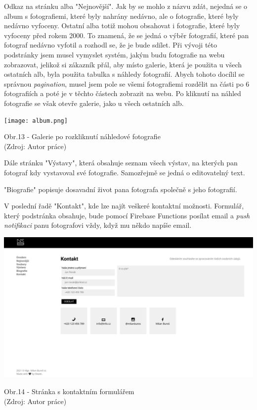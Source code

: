 \documentclass[12pt,a4paper]{report}
\begin{document}
  Odkaz na stránku alba "Nejnovější". 
  Jak by se mohlo z názvu zdát, nejedná se o album s fotografiemi, které byly nahrány nedávno, ale 
  o fotografie, které byly nedávno vyfoceny. Ostatní alba totiž mohou obsahovat i fotografie, které byly
  vyfoceny před rokem 2000. To znamená, že se
  jedná o výběr fotografií, které pan fotograf nedávno vyfotil a rozhodl se, že je bude sdílet. Při
  vývoji této podstránky jsem musel vymyslet systém, jakým budu fotografie na webu zobrazovat,
  jelikož si zákazník přál, aby místo galerie, která je použita u všech ostatních alb, byla použita
  tabulka s náhledy fotografií. Abych tohoto docílil se správnou \emph{pagination}, musel jsem pole
  se všemi fotografiemi rozdělit na části po 6 fotografiích a poté je v těchto částech zobrazit na
  webu. Po kliknutí na náhled fotografie se však otevře galerie, jako u všech ostatních alb.
  
  \vspace*{0.5cm}
  \noindent\texttt{[image: album.png]}
  \begin{center}
    Obr.13 - Galerie po rozkliknutí náhledové fotografie  \\
    (Zdroj: Autor práce)
  \end{center}
  \vspace*{0.5cm}
 
  Dále stránku "Výstavy", která obsahuje seznam všech výstav, na kterých pan fotograf kdy vystavoval
  své fotografie. Samozřejmě se jedná o editovatelný text.
  
  "Biografie" popisuje dosavadní život pana fotografa společně s jeho fotografií.
  
  V poslední řadě "Kontakt", kde lze najít veškeré kontaktní možnosti. Formulář, který podstránka
  obsahuje, bude pomocí Firebase Functions posílat email a \emph{push notifikaci} panu fotografovi vždy,
  když mu někdo napíše email.

  \vspace*{0.5cm}
  \noindent\includegraphics[width=\linewidth]{contact.png}
  \begin{center}
    Obr.14 -  Stránka s kontaktním formulářem \\
    (Zdroj: Autor práce)
  \end{center}
  \vspace*{0.5cm}
\end{document}
